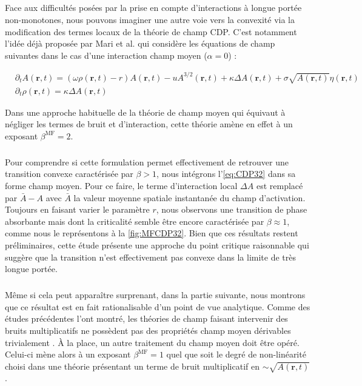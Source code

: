 \label{sec:CMnaif}

\subparagraph{}Face aux difficultés posées par la prise en compte d'interactions à longue portée non-monotones, nous pouvons imaginer une autre voie vers la convexité via la modification des termes locaux de la théorie de champ CDP. C'est notamment l'idée déjà proposée par Mari et al. \cite{mari_absorbing_2022} qui considère les équations de champ suivantes dans le cas d'une interaction champ moyen ($\alpha = 0$) :

\begin{equation}
\begin{aligned}
	&\partial_t A(\mathbf{r}, t) = (\omega\rho (\mathbf{r}, t) - r)A(\mathbf{r}, t) - uA^{3/2}(\mathbf{r}, t) + \kappa\Delta A (\mathbf{r}, t) + \sigma \sqrt{A(\mathbf{r}, t)} \eta(\mathbf{r}, t)\\
	&\partial_t \rho (\mathbf{r}, t) = \kappa\Delta A (\mathbf{r}, t)
\end{aligned}
\label{eq:CDP32}
\end{equation}

\noindent Dans une approche habituelle de la théorie de champ moyen qui équivaut à négliger les termes de bruit et d'interaction, cette théorie amène en effet à un exposant $\beta^\text{MF} = 2$.

\subparagraph{}Pour comprendre si cette formulation permet effectivement de retrouver une transition convexe caractérisée par $\beta > 1$, nous intégrons l'\autoref{eq:CDP32} dans sa forme champ moyen. Pour ce faire, le terme d'interaction local $\Delta A$ est remplacé par $\bar{A}-A$ avec $\bar{A}$ la valeur moyenne spatiale instantanée du champ d'activation. Toujours en faisant varier le paramètre $r$, nous observons une transition de phase absorbante mais dont la criticalité semble être encore caractérisée par $\beta \approx 1$, comme nous le représentons à la \autoref{fig:MFCDP32}. Bien que ces résultats restent préliminaires, cette étude présente une approche du point critique raisonnable qui suggère que la transition n'est effectivement pas convexe dans la limite de très longue portée.

\subparagraph{}Même si cela peut apparaître surprenant, dans la partie suivante, nous montrons que ce résultat est en fait rationalisable d'un point de vue analytique. Comme des études précédentes l'ont montré, les théories de champ faisant intervenir des bruits multiplicatifs ne possèdent pas des propriétés champ moyen dérivables trivialement \cite{munoz_mean_field_2005, munoz_multiplicative_2003}. \`A la place, un autre traitement du champ moyen doit être opéré. Celui-ci mène alors à un exposant $\beta^\text{MF} = 1$ quel que soit le degré de non-linéarité choisi dans une théorie présentant un terme de bruit multiplicatif en $\sim \sqrt{A(\mathbf{r}, t)}$.

